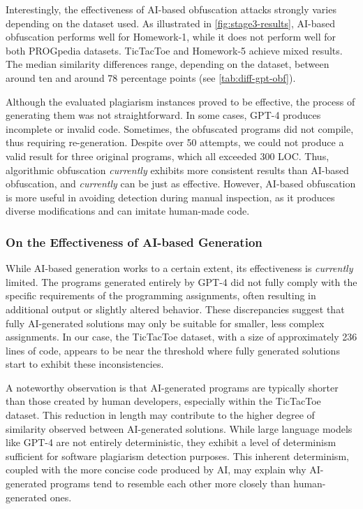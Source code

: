 Interestingly, the effectiveness of AI-based obfuscation attacks strongly varies depending on the dataset used. As illustrated in \autoref{fig:stage3-results}, AI-based obfuscation performs well for Homework-1, while it does not perform well for both PROGpedia datasets. TicTacToe and Homework-5 achieve mixed results. The median similarity differences range, depending on the dataset, between around ten and around 78 percentage points (see \autoref{tab:diff-gpt-obf}).

Although the evaluated plagiarism instances proved to be effective, the process of generating them was not straightforward.
In some cases, GPT-4 produces incomplete or invalid code. Sometimes, the obfuscated programs did not compile, thus requiring re-generation.
Despite over 50 attempts, we could not produce a valid result for three original programs, which all exceeded 300 LOC.
%
Thus, algorithmic obfuscation \textit{currently} exhibits more consistent results than AI-based obfuscation, and \textit{currently} can be just as effective.
However, AI-based obfuscation is more useful in avoiding detection during manual inspection, as it produces diverse modifications and can imitate human-made code.

\subsubsection{On the Effectiveness of AI-based Generation}

While AI-based generation works to a certain extent, its effectiveness is \textit{currently} limited. 
The programs generated entirely by GPT-4 did not fully comply with the specific requirements of the programming assignments, often resulting in additional output or slightly altered behavior.
These discrepancies suggest that fully AI-generated solutions may only be suitable for smaller, less complex assignments.
In our case, the TicTacToe dataset, with a size of approximately 236 lines of code, appears to be near the threshold where fully generated solutions start to exhibit these inconsistencies.

A noteworthy observation is that AI-generated programs are typically shorter than those created by human developers, especially within the TicTacToe dataset. This reduction in length may contribute to the higher degree of similarity observed between AI-generated solutions. While large language models like GPT-4 are not entirely deterministic, they exhibit a level of determinism sufficient for software plagiarism detection purposes. This inherent determinism, coupled with the more concise code produced by AI, may explain why AI-generated programs tend to resemble each other more closely than human-generated ones.

